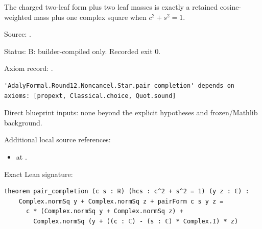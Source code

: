 \begin{theorem}[bp-192]
\label{bp-192}
\uses{}
\leanok
The charged two-leaf form plus two leaf masses is exactly a retained cosine-weighted mass plus one complex square when \(c^2+s^2=1\).

\par Source: \texttt{}.
\par Status: B: builder-compiled only. Recorded exit 0.
\par Axiom record: \texttt{}.
\begin{verbatim}
'AdalyFormal.Round12.Noncancel.Star.pair_completion' depends on axioms: [propext, Classical.choice, Quot.sound]
\end{verbatim}
\par Direct blueprint inputs: none beyond the explicit hypotheses and frozen/Mathlib background.
\par Additional local source references:
\begin{itemize}
\item \texttt{} at \texttt{}.
\end{itemize}
\par Exact Lean signature:
\begin{verbatim}
theorem pair_completion (c s : ℝ) (hcs : c^2 + s^2 = 1) (y z : ℂ) :
    Complex.normSq y + Complex.normSq z + pairForm c s y z =
      c * (Complex.normSq y + Complex.normSq z) +
        Complex.normSq (y + ((c : ℂ) - (s : ℂ) * Complex.I) * z)
\end{verbatim}
\end{theorem}

